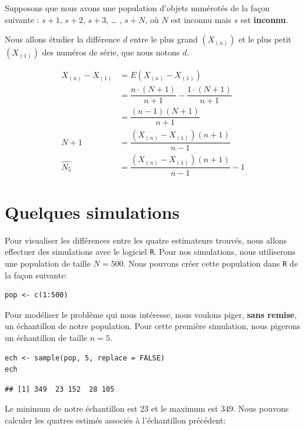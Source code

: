 \documentclass[10pt]{article}
\begin{document}
Supposons que nous avons une population d'objets numérotés de la façon
suivante : \(s+1\), \(s+2\), \(s+3\), \ldots{} , \(s+N\), où \(N\) est
inconnu mais \(s\) est \textbf{inconnu}.

Nous allons étudier la différence \(d\) entre le plus grand
\((X_{(n)})\) et le plus petit \((X_{(1)})\) des numéros de série, que
nous notons \(d\).

\begin{align*}
X_{(n)}-X_{(1)} &= E(X_{(n)}-X_{(1)}) \\
&= \dfrac{n\cdot(N+1)}{n+1}-\dfrac{1\cdot(N+1)}{n+1} \\
&= \dfrac{(n-1)(N+1)}{n+1} \\
N+1 &= \dfrac{(X_{(n)}-X_{(1)})(n+1)}{n-1} \\
\widehat{N_5} &= \dfrac{(X_{(n)}-X_{(1)})(n+1)}{n-1}-1
\end{align*}

\hypertarget{quelques-simulations}{%
\section{\texorpdfstring{Quelques simulations
\label{simul}}{Quelques simulations }}\label{quelques-simulations}}

Pour visualiser les différences entre les quatre estimateurs trouvés,
nous allons effectuer des simulations avec le logiciel \texttt{R}. Pour
nos simulations, nous utiliserons une population de taille \(N=500\).
Nous pouvons créer cette population dans \texttt{R} de la façon
suivante:

\begin{verbatim}
pop <- c(1:500)
\end{verbatim}

Pour modéliser le problème qui nous intéresse, nous voulons piger,
\textbf{sans remise}, un échantillon de notre population. Pour cette
première simulation, nous pigerons un échantillon de taille \(n=5\).

\begin{verbatim}
ech <- sample(pop, 5, replace = FALSE)
ech
\end{verbatim}

\begin{verbatim}
## [1] 349  23 152  28 105
\end{verbatim}

Le minimum de notre échantillon est 23 et le maximum est 349. Nous
pouvons calculer les quatres estimés associés à l'échantillon précédent:
\end{document}
